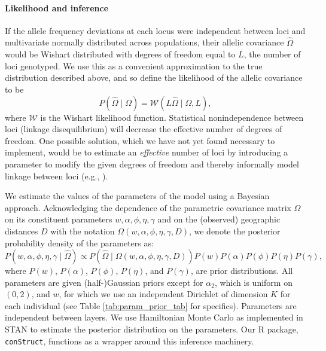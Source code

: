 \documentclass[10pt,letterpaper]{article}
\begin{document}
\paragraph{Likelihood and inference}
If the allele frequency deviations at each locus
were independent between loci and multivariate normally distributed across populations, 
their allelic covariance $\widehat{\Omega}$ 
would be Wishart distributed with degrees of freedom equal to $L$, 
the number of loci genotyped.
We use this as a convenient approximation to the true distribution described above,
and so define the likelihood of the allelic covariance to be
\begin{equation}
    P(\widehat{\Omega} \; | \; \Omega) 
    = 
    \mathcal{W} \left( L\widehat{\Omega} \; | \; \Omega,L\right) ,
\end{equation}
where $\mathcal{W}$ is the Wishart likelihood function.
Statistical nonindependence between loci (linkage disequilibrium)
will decrease the effective
number of degrees of freedom.  
One possible solution, which we have not yet found necessary to implement,
would be to estimate an \emph{effective} number of loci 
by introducing a parameter to modify the given degrees of freedom 
and thereby informally model linkage between loci (e.g., \cite{EEMS}).

We estimate the values of the parameters of the model using a Bayesian approach.
Acknowledging the dependence of the parametric covariance matrix $\Omega$ on its constituent parameters
$w,\alpha,\phi,\eta,\gamma$ and on the (observed) geographic distances $D$ 
with the notation $\Omega(w,\alpha,\phi,\eta,\gamma,D)$,
we denote the posterior probability density of the parameters as:
\begin{equation}
P\left( w,\alpha,\phi,\eta,\gamma \;|\; \widehat{\Omega} \right) 
    \propto
    P\left(\widehat{\Omega} \; | \; \Omega(w,\alpha,\phi,\eta,\gamma,D) \right)
    P(w)P(\alpha)P(\phi)P(\eta)P(\gamma) ,
\end{equation}
where $P(w)$, $P(\alpha)$, $P(\phi)$, $P(\eta)$, and $P(\gamma)$, are prior distributions.
All parameters are given (half-)Gaussian priors 
except for $\alpha_2$, which is uniform on $(0,2)$, 
and $w$, for which we use an independent Dirichlet of dimension $K$ for each individual
(see Table \ref{tab:param_prior_tab} for specifics).
Parameters are independent between layers.
We use Hamiltonian Monte Carlo as implemented in STAN \cite{stan, NUTS, stan_lib, rstan} 
to estimate the posterior distribution on the parameters.
Our R package, \texttt{conStruct},
functions as a wrapper around this inference machinery.
\end{document}
